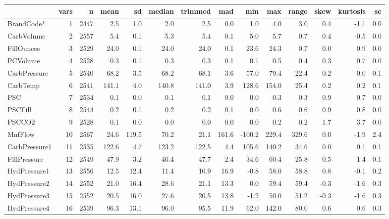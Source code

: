\documentclass[]{report}
\begin{document}
\begin{table}[H]
\centering\begingroup\fontsize{8}{10}\selectfont

\begin{tabular}{lrrrrrrrrrrrrr}
\toprule
  & vars & n & mean & sd & median & trimmed & mad & min & max & range & skew & kurtosis & se\\
\midrule
\rowcolor{gray!6}  BrandCode* & 1 & 2447 & 2.5 & 1.0 & 2.0 & 2.5 & 0.0 & 1.0 & 4.0 & 3.0 & 0.4 & -1.1 & 0.0\\
CarbVolume & 2 & 2557 & 5.4 & 0.1 & 5.3 & 5.4 & 0.1 & 5.0 & 5.7 & 0.7 & 0.4 & -0.5 & 0.0\\
\rowcolor{gray!6}  FillOunces & 3 & 2529 & 24.0 & 0.1 & 24.0 & 24.0 & 0.1 & 23.6 & 24.3 & 0.7 & 0.0 & 0.9 & 0.0\\
PCVolume & 4 & 2528 & 0.3 & 0.1 & 0.3 & 0.3 & 0.1 & 0.1 & 0.5 & 0.4 & 0.3 & 0.7 & 0.0\\
\rowcolor{gray!6}  CarbPressure & 5 & 2540 & 68.2 & 3.5 & 68.2 & 68.1 & 3.6 & 57.0 & 79.4 & 22.4 & 0.2 & 0.0 & 0.1\\
\addlinespace
CarbTemp & 6 & 2541 & 141.1 & 4.0 & 140.8 & 141.0 & 3.9 & 128.6 & 154.0 & 25.4 & 0.2 & 0.2 & 0.1\\
\rowcolor{gray!6}  PSC & 7 & 2534 & 0.1 & 0.0 & 0.1 & 0.1 & 0.0 & 0.0 & 0.3 & 0.3 & 0.9 & 0.7 & 0.0\\
PSCFill & 8 & 2544 & 0.2 & 0.1 & 0.2 & 0.2 & 0.1 & 0.0 & 0.6 & 0.6 & 0.9 & 0.8 & 0.0\\
\rowcolor{gray!6}  PSCCO2 & 9 & 2528 & 0.1 & 0.0 & 0.0 & 0.0 & 0.0 & 0.0 & 0.2 & 0.2 & 1.7 & 3.7 & 0.0\\
MnfFlow & 10 & 2567 & 24.6 & 119.5 & 70.2 & 21.1 & 161.6 & -100.2 & 229.4 & 329.6 & 0.0 & -1.9 & 2.4\\
\addlinespace
\rowcolor{gray!6}  CarbPressure1 & 11 & 2535 & 122.6 & 4.7 & 123.2 & 122.5 & 4.4 & 105.6 & 140.2 & 34.6 & 0.0 & 0.1 & 0.1\\
FillPressure & 12 & 2549 & 47.9 & 3.2 & 46.4 & 47.7 & 2.4 & 34.6 & 60.4 & 25.8 & 0.5 & 1.4 & 0.1\\
\rowcolor{gray!6}  HydPressure1 & 13 & 2556 & 12.5 & 12.4 & 11.4 & 10.9 & 16.9 & -0.8 & 58.0 & 58.8 & 0.8 & -0.1 & 0.2\\
HydPressure2 & 14 & 2552 & 21.0 & 16.4 & 28.6 & 21.1 & 13.3 & 0.0 & 59.4 & 59.4 & -0.3 & -1.6 & 0.3\\
\rowcolor{gray!6}  HydPressure3 & 15 & 2552 & 20.5 & 16.0 & 27.6 & 20.5 & 13.8 & -1.2 & 50.0 & 51.2 & -0.3 & -1.6 & 0.3\\
\addlinespace
HydPressure4 & 16 & 2539 & 96.3 & 13.1 & 96.0 & 95.5 & 11.9 & 62.0 & 142.0 & 80.0 & 0.6 & 0.6 & 0.3\\

\end{tabular}
\end{table}
\end{document}
